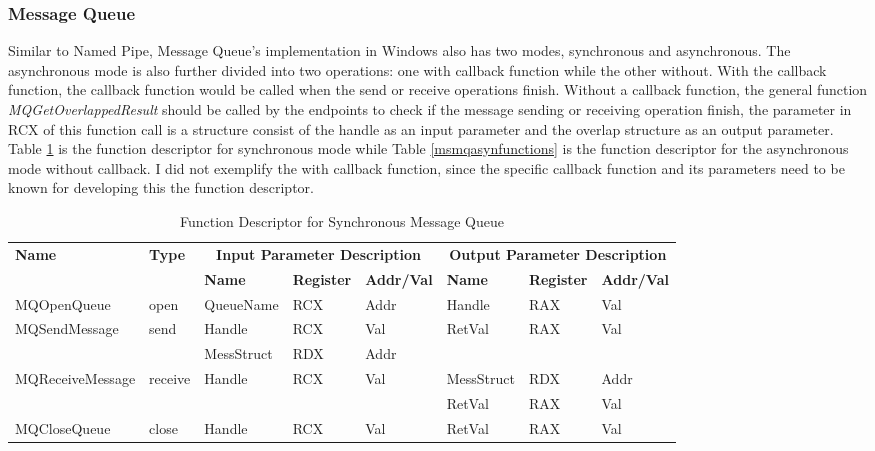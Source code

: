 \subsubsection{Message Queue}
Similar to Named Pipe, Message Queue's implementation in Windows also has two modes, synchronous and asynchronous. The asynchronous mode is also further divided into two operations: one with callback function while the other without. With the callback function, the callback function would be called when the send or receive operations finish. Without a callback function, the general function \textit{MQGetOverlappedResult} should be called by the endpoints to check if the message sending or receiving operation finish, the parameter in RCX of this function call is a structure consist of the handle as an input parameter and the overlap structure as an output parameter. Table \ref{msmqsynfunctions} is the function descriptor for synchronous mode while Table \ref{msmqasynfunctions} is the function descriptor for the asynchronous mode without callback. I did not exemplify the with callback function, since the specific callback function and its parameters need to be known for developing this the function descriptor.

\begin{table}[H]
  \centering
  \caption{Function Descriptor for Synchronous Message Queue}
  \label{msmqsynfunctions}
\begin{tabular}{|l|l|l|l|l|l|l|l|}
\hline
             \multirow{2}{*}{{\textbf{Name}}} & \multirow{2}{*}{{\textbf{Type}}} & \multicolumn{3}{c|}{\textbf{Input Parameter Description}} & \multicolumn{3}{c|}{\textbf{Output Parameter Description}} \\
              \cline{3-8} 
             & & \textbf{Name}& \textbf{Register} & \textbf{Addr/Val} & \textbf{Name}& \textbf{Register} &  \textbf{Addr/Val}  \\
             \hline
      MQOpenQueue
       &open & QueueName & RCX  & Addr &  Handle & RAX & Val\\
      \hline                     
      \multirow{2}{*}{MQSendMessage}
       &\multirow{2}{*}{send} &  Handle & RCX & Val & \multirow{2}{*}{RetVal} & \multirow{2}{*}{RAX}  & \multirow{2}{*}{Val} \\
       \cline{3-5}
      & & MessStruct& RDX&Addr &   &  &  \\
      \hline            
      \multirow{2}{*}{MQReceiveMessage}
       &\multirow{2}{*}{receive}&  \multirow{2}{*}{Handle} & \multirow{2}{*}{RCX} & \multirow{2}{*}{Val}& MessStruct& RDX&Addr\\
              \cline{6-8}
      & & & & & RetVal & RAX & Val\\
      \hline       
      MQCloseQueue &
       close &  Handle & RCX & Val & RetVal & RAX & Val\\
      \hline                          
  \end{tabular}   
\end{table}

